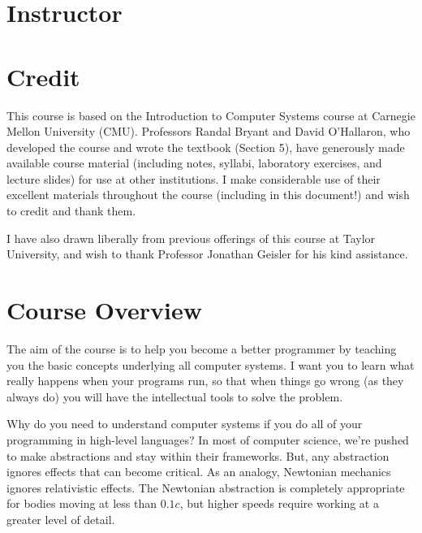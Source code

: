 \documentclass[11pt]{article}
\begin{document}
\section{Instructor}



\section{Credit}

This course is based on the Introduction to Computer Systems course
at Carnegie Mellon University (CMU).
Professors Randal Bryant and David O’Hallaron,
who developed the course and wrote the textbook (Section 5),
have generously made available course material
(including notes, syllabi, laboratory exercises, and lecture slides)
for use at other institutions.
I make considerable use of their excellent materials throughout the course
(including in this document!) and wish to credit and thank them.

I have also drawn liberally from previous offerings of this course
at Taylor University,
and wish to thank Professor Jonathan Geisler for his kind assistance.

\section{Course Overview}

The aim of the course is to help you become a better programmer by teaching you
the basic concepts underlying all computer systems. I want you to learn what
really happens when your programs run, so that when things go wrong (as they
always do) you will have the intellectual tools to solve the problem.

Why do you need to understand computer systems if you do all of your
programming in high-level languages? In most of computer science, we're pushed
to make abstractions and stay within their frameworks. But, any abstraction
ignores effects that can become critical. As an analogy, Newtonian mechanics
ignores relativistic effects. The Newtonian abstraction is completely
appropriate for bodies moving at less than \(0.1c\), but higher speeds require
working at a greater level of detail.
\end{document}
